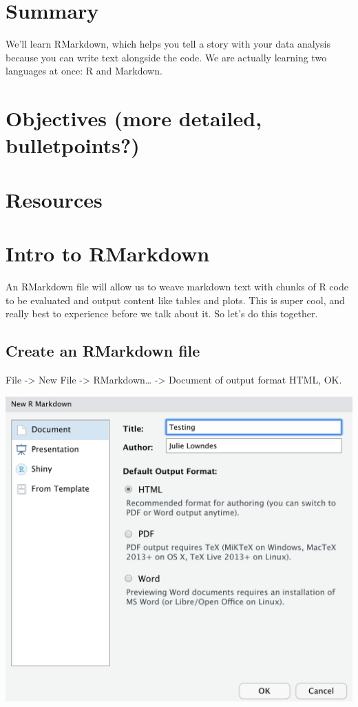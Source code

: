 \documentclass[]{book}
\begin{document}
\hypertarget{summary-1}{%
\section{Summary}\label{summary-1}}

We'll learn RMarkdown, which helps you tell a story with your data analysis because you can write text alongside the code. We are actually learning two languages at once: R and Markdown.

\hypertarget{objectives-more-detailed-bulletpoints-1}{%
\section{Objectives (more detailed, bulletpoints?)}\label{objectives-more-detailed-bulletpoints-1}}

\hypertarget{resources-1}{%
\section{Resources}\label{resources-1}}

\hypertarget{intro-to-rmarkdown}{%
\section{Intro to RMarkdown}\label{intro-to-rmarkdown}}

An RMarkdown file will allow us to weave markdown text with chunks of R code to be evaluated and output content like tables and plots. This is super cool, and really best to experience before we talk about it. So let's do this together.

\hypertarget{create-an-rmarkdown-file}{%
\subsection{Create an RMarkdown file}\label{create-an-rmarkdown-file}}

File -\textgreater{} New File -\textgreater{} RMarkdown\ldots{} -\textgreater{} Document of output format HTML, OK.

\includegraphics[width=0.8\linewidth]{img/rstudio_new-rmd-doc-html}
\end{document}
